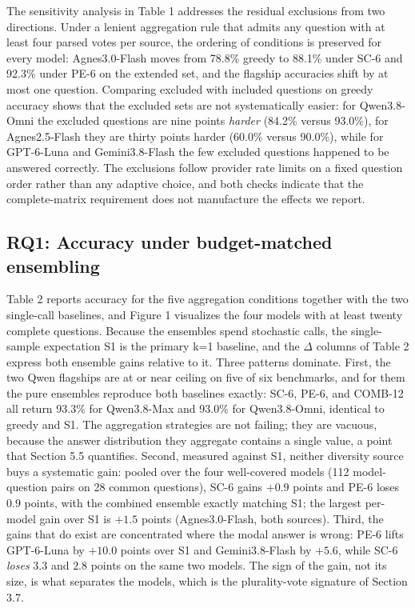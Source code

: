\documentclass[preprint,12pt]{elsarticle}
\begin{document}
The sensitivity analysis in Table 1 addresses the residual exclusions from two directions. Under a lenient aggregation rule that admits any question with at least four parsed votes per source, the ordering of conditions is preserved for every model: Agnes3.0-Flash moves from 78.8\% greedy to 88.1\% under SC-6 and 92.3\% under PE-6 on the extended set, and the flagship accuracies shift by at most one question. Comparing excluded with included questions on greedy accuracy shows that the excluded sets are not systematically easier: for Qwen3.8-Omni the excluded questions are nine points \emph{harder} (84.2\% versus 93.0\%), for Agnes2.5-Flash they are thirty points harder (60.0\% versus 90.0\%), while for GPT-6-Luna and Gemini3.8-Flash the few excluded questions happened to be answered correctly. The exclusions follow provider rate limits on a fixed question order rather than any adaptive choice, and both checks indicate that the complete-matrix requirement does not manufacture the effects we report.

\subsection{RQ1: Accuracy under budget-matched ensembling}


Table 2 reports accuracy for the five aggregation conditions together with the two single-call baselines, and Figure 1 visualizes the four models with at least twenty complete questions. Because the ensembles spend stochastic calls, the single-sample expectation S1 is the primary k=1 baseline, and the $\Delta$ columns of Table 2 express both ensemble gains relative to it. Three patterns dominate. First, the two Qwen flagships are at or near ceiling on five of six benchmarks, and for them the pure ensembles reproduce both baselines exactly: SC-6, PE-6, and COMB-12 all return 93.3\% for Qwen3.8-Max and 93.0\% for Qwen3.8-Omni, identical to greedy and S1. The aggregation strategies are not failing; they are vacuous, because the answer distribution they aggregate contains a single value, a point that Section 5.5 quantifies. Second, measured against S1, neither diversity source buys a systematic gain: pooled over the four well-covered models (112 model-question pairs on 28 common questions), SC-6 gains $+0.9$ points and PE-6 loses $0.9$ points, with the combined ensemble exactly matching S1; the largest per-model gain over S1 is $+1.5$ points (Agnes3.0-Flash, both sources). Third, the gains that do exist are concentrated where the modal answer is wrong: PE-6 lifts GPT-6-Luna by $+10.0$ points over S1 and Gemini3.8-Flash by $+5.6$, while SC-6 \emph{loses} $3.3$ and $2.8$ points on the same two models. The sign of the gain, not its size, is what separates the models, which is the plurality-vote signature of Section 3.7.
\end{document}
